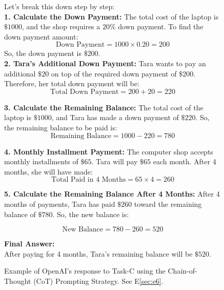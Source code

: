 \documentclass{article}
\begin{document}
\begin{figure*}[h!]
    \centering
    \begin{tcolorbox}[colframe=black!10!white, colback=black!5!white]
        \begin{minipage}{\textwidth}
            \ttfamily
            Let's break this down step by step: \\

            \textbf{1. Calculate the Down Payment:}
            The total cost of the laptop is $\$ 1000$, and the shop requires a $20\%$ down payment. To find the down payment amount:
            \[
            \text{Down Payment} = 1000 \times 0.20 = 200
            \]
            So, the down payment is $\$ 200$. \\

            \textbf{2. Tara's Additional Down Payment:}
            Tara wants to pay an additional $\$ 20$ on top of the required down payment of $\$ 200$. Therefore, her total down payment will be:
            \[
            \text{Total Down Payment} = 200 + 20 = 220
            \]

            \textbf{3. Calculate the Remaining Balance:}
            The total cost of the laptop is $\$ 1000$, and Tara has made a down payment of $\$ 220$. So, the remaining balance to be paid is:
            \[
            \text{Remaining Balance} = 1000 - 220 = 780
            \]

            \textbf{4. Monthly Installment Payment:}
            The computer shop accepts monthly installments of $\$ 65$. Tara will pay $\$ 65$ each month. After 4 months, she will have made:
            \[
            \text{Total Paid in 4 Months} = 65 \times 4 = 260
            \]

            \textbf{5. Calculate the Remaining Balance After 4 Months:}
            After 4 months of payments, Tara has paid $\$ 260$ toward the remaining balance of $\$ 780$. So, the new balance is:

            \[
            \text{New Balance} = 780 - 260 = 520
            \]

            \textbf{Final Answer:}\\
            After paying for 4 months, Tara's remaining balance will be \textbf{$\$ 520$}.
        \end{minipage}
    \end{tcolorbox}
    \caption{Example of OpenAI's  response to Task-C using the Chain-of-Thought (CoT) Prompting Strategy. See E\ref{sec:e6}.}
    \label{E6:few-shot-prompt-example}
\end{figure*}
\end{document}
